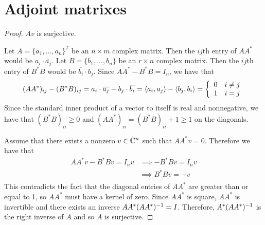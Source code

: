 \section{Adjoint matrixes}
\begin{proof} $Av$ is surjective.\gap

    Let $A = \{a_1,...,a_n\}^T$ be an $n \times m$ complex matrix.
    Then the $ij$th entry of $AA^*$ would be $a_i \cdot \overline{a_j}$.
    Let $B = \{b_1,...,b_n\}$ be an $r \times n$ complex matrix.
    Then the $ij$th entry of $B^*B$ would be $\overline{b_i} \cdot b_j$.
    Since $AA^* - B^*B = I_n$, we have that
    \[
        (AA^*)_{ij} - (B^*B)_{ij} =
        a_i \cdot \overline{a_j} - b_j \cdot \overline{b_i} = 
        \langle a_i, a_j \rangle - \langle b_j, b_i \rangle=
        \left\{
        \begin{array}{ll}
            0 & i \neq j \\
            1 & i = j \\
        \end{array} 
        \right.
    \]
    Since the standard inner product of a vector to itself is real and nonnegative, 
    we have that $(B^*B)_{ii} \geq 0$ and $(AA^*)_{ii} = (B^*B)_{ii} + 1 \geq 1$ on the diagonals.\gap

    Assume that there exists a nonzero $v \in \mathbb{C}^n$ 
    such that $AA^*v = 0$.
    Therefore we have that
    \begin{align*}
        AA^*v - B^*Bv = I_nv
        &\implies -B^*Bv = I_nv\\
        &\implies B^*Bv = -v\\
    \end{align*}
    This contradicts the fact that the diagonal entries of $AA^*$
    are greater than or equal to 1, so $AA^*$ must have a kernel of zero.
    Since $AA^*$ is square, $AA^*$ is invertible and 
    there exists an inverse $AA^*(AA^*)^{-1} = I$.
    Therefore, $A^*(AA^*)^{-1}$ is the right inverse of $A$ 
    and so $A$ is surjective.
\end{proof}